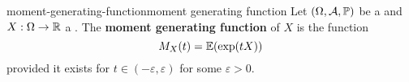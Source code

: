 \begin{topic}{moment-generating-function}{moment generating function}
    Let $(\Omega, \mathcal{A}, \mathbb{P})$ be a  and $X : \Omega \to \mathbb{R}$ a . The \textbf{moment generating function} of $X$ is the function
    \[ M_X(t) = \mathbb{E}(\exp(t X)) \]
    provided it exists for $t \in (-\varepsilon, \varepsilon)$ for some $\varepsilon > 0$.
\end{topic}
